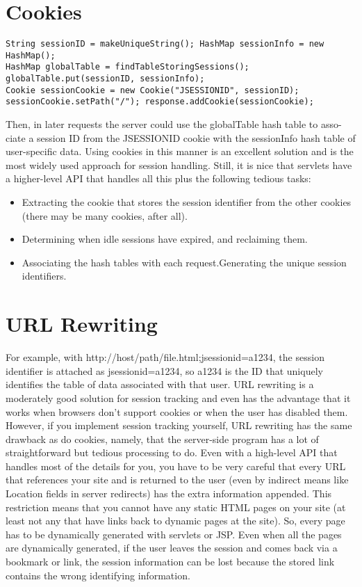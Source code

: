 \documentclass[a4paper,10pt]{scrreprt}
\begin{document}
{\section{Cookies}
\begin{lstlisting}[caption=Java Using Session]
String sessionID = makeUniqueString(); HashMap sessionInfo = new
HashMap();
HashMap globalTable = findTableStoringSessions();
globalTable.put(sessionID, sessionInfo);
Cookie sessionCookie = new Cookie("JSESSIONID", sessionID);
sessionCookie.setPath("/"); response.addCookie(sessionCookie);
\end{lstlisting}

Then, in later requests the server could use the globalTable hash table to asso- ciate a session ID from the
JSESSIONID cookie with the sessionInfo hash table of user-specific data.
Using cookies in this manner is an excellent solution and is the most widely used approach for session handling.
Still, it is nice that servlets have a higher-level API that handles all this plus the following tedious tasks:


\begin{itemize}
\item Extracting the cookie that stores the session identifier from the other cookies (there may be
many cookies, after all).
\item Determining when idle sessions have expired, and reclaiming them.
\item Associating the hash tables with each request.Generating the unique session identifiers.
\end{itemize}

\section{URL Rewriting}
For example, with
http://host/path/file.html;jsessionid=a1234, the session identifier is attached as jsessionid=a1234, so a1234 is the ID
that uniquely identifies the table of data associated with that user.
URL rewriting is a moderately good solution for session tracking and even has the advantage that it works when
browsers don’t support cookies or when the user has disabled them. However, if you implement session tracking
yourself, URL rewriting has the same drawback as do cookies, namely, that the server-side program has a lot of
straightforward but tedious processing to do. Even with a high-level API that handles most of the details for you,
you have to be very careful that every URL that references your site and is returned to the user (even by indirect
means like Location fields in server redirects) has the extra information appended. This restriction means that you
cannot have any static HTML pages on your site (at least not any that have links back to dynamic pages at the
site). So, every page has to be dynamically generated with servlets or JSP. Even when all the pages are
dynamically generated, if the user leaves the session and comes back via a bookmark or link, the session information
can be lost because the stored link contains the wrong identifying information.


}
\end{document}
